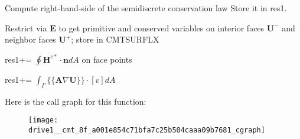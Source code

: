 Compute right-\/hand-\/side of the semidiscrete conservation law Store it in res1. 

Restrict via $\mathbf{E}$ to get primitive and conserved variables on interior faces $\mathbf{U}^-$ and neighbor faces $\mathbf{U}^+$; store in C\-M\-T\-S\-U\-R\-F\-L\-X

res1+= $\oint \mathbf{H}^{c\ast}\cdot\mathbf{n}dA$ on face points

res1+= $\int_{\Gamma} \{\{\mathbf{A}\nabla \mathbf{U}\}\} \cdot \left[v\right] dA$ 

Here is the call graph for this function\-:
\nopagebreak
\begin{figure}[H]
\begin{center}
\leavevmode
\texttt{[image: drive1\_\_cmt\_8f\_a001e854c71bfa7c25b504caaa09b7681\_cgraph]}
\end{center}
\end{figure}


